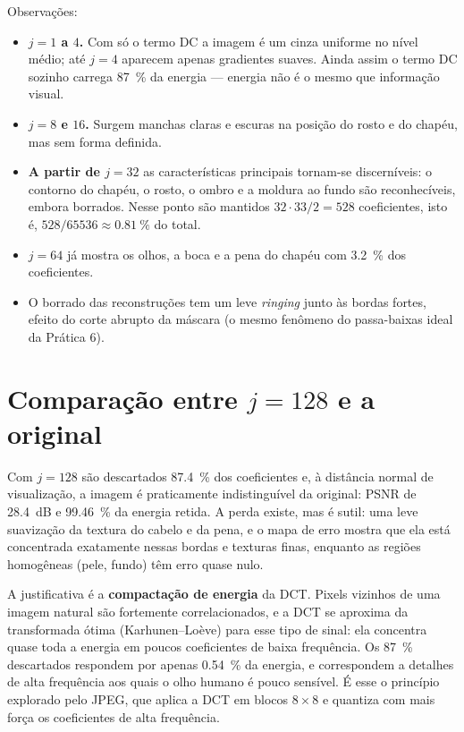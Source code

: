 \documentclass[11pt,a4paper]{article}
\begin{document}
Observações:

\begin{itemize}\itemsep0pt
  \item \textbf{$j=1$ a $4$.} Com só o termo DC a imagem é um cinza uniforme no nível
        médio; até $j=4$ aparecem apenas gradientes suaves. Ainda assim o termo DC
        sozinho carrega \SI{87}{\percent} da energia --- energia não é o mesmo que
        informação visual.
  \item \textbf{$j=8$ e $16$.} Surgem manchas claras e escuras na posição do rosto e do
        chapéu, mas sem forma definida.
  \item \textbf{A partir de $j=32$} as características principais tornam-se
        discerníveis: o contorno do chapéu, o rosto, o ombro e a moldura ao fundo são
        reconhecíveis, embora borrados. Nesse ponto são mantidos
        $32\cdot33/2 = 528$ coeficientes, isto é,
        $528/65536 \approx \SI{0,81}{\percent}$ do total.
  \item \textbf{$j=64$} já mostra os olhos, a boca e a pena do chapéu com
        \SI{3,2}{\percent} dos coeficientes.
  \item O borrado das reconstruções tem um leve \emph{ringing} junto às bordas fortes,
        efeito do corte abrupto da máscara (o mesmo fenômeno do passa-baixas ideal da
        Prática 6).
\end{itemize}

\section{Comparação entre $j=128$ e a original}

Com $j=128$ são descartados \SI{87,4}{\percent} dos coeficientes e, à distância normal
de visualização, a imagem é praticamente indistinguível da original: PSNR de
\SI{28,4}{dB} e \SI{99,46}{\percent} da energia retida. A perda existe, mas é sutil:
uma leve suavização da textura do cabelo e da pena, e o mapa de erro mostra que ela
está concentrada exatamente nessas bordas e texturas finas, enquanto as regiões
homogêneas (pele, fundo) têm erro quase nulo.

A justificativa é a \textbf{compactação de energia} da DCT. Pixels vizinhos de uma
imagem natural são fortemente correlacionados, e a DCT se aproxima da transformada
ótima (Karhunen--Loève) para esse tipo de sinal: ela concentra quase toda a energia em
poucos coeficientes de baixa frequência. Os \SI{87}{\percent} descartados respondem por
apenas \SI{0,54}{\percent} da energia, e correspondem a detalhes de alta frequência aos
quais o olho humano é pouco sensível. É esse o princípio explorado pelo JPEG, que aplica
a DCT em blocos $8\times8$ e quantiza com mais força os coeficientes de alta frequência.
\end{document}
